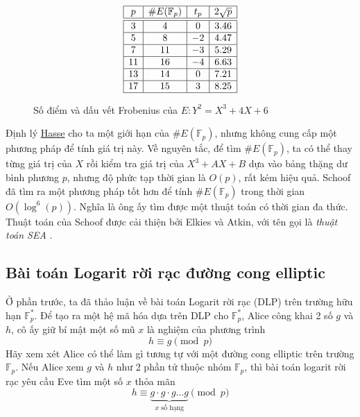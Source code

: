 \begin{figure}[H]
	\label{fg:tb2}
	\caption{Số điểm và dấu vết Frobenius của $E:Y^2 = X^3 + 4X + 6$}
	$$
		\begin{array}{|c|c|c|c|}
			\hline
			p  & \#E(\mathbb{F}_p) & t_p & 2\sqrt{p} \\
			\hline
			\hline
			3  & 4                 & 0   & 3.46      \\
			\hline
			5  & 8                 & -2  & 4.47      \\
			\hline
			7  & 11                & -3  & 5.29      \\
			\hline
			11 & 16                & -4  & 6.63      \\
			\hline
			13 & 14                & 0   & 7.21      \\
			\hline
			17 & 15                & 3   & 8.25      \\
			\hline
		\end{array}
	$$
\end{figure}

\begin{remark}
	Định lý \hyperref[th:th4]{Hasse} cho ta một giới hạn của $\#E(\mathbb{F}_p)$, nhưng không cung cấp một phương pháp để tính giá trị này.
	Về nguyên tắc, để tìm $\#E(\mathbb{F}_p)$, ta có thể thay từng giá trị của $X$ rồi kiểm tra giá trị của $X^3 + AX + B$ dựa vào bảng thặng dư bình phương $p$, nhưng độ phức tạp thời gian là $O(p)$, rất kém hiệu quả.
	Schoof \cite{schoof1985elliptic} đã tìm ra một phương pháp tốt hơn để tính $\#E(\mathbb{F}_p)$ trong thời gian $O(\log^6(p))$.
	Nghĩa là ông ấy tìm được một thuật toán có thời gian đa thức. Thuật toán của Schoof được cải thiện bởi Elkies và Atkin, với tên gọi là \textit{thuật toán SEA} \cite{schoof1995counting}.
\end{remark}


\subsection{Bài toán Logarit rời rạc đường cong elliptic}
Ở phần trước, ta đã thảo luận về bài toán Logarit rời rạc (DLP) trên trường hữu hạn $\mathbb{F}^*_p$.
Để tạo ra một hệ mã hóa dựa trên DLP cho $\mathbb{F}^*_p$, Alice công khai 2 số $g$ và $h$, cô ấy giữ bí mật một số mũ $x$ là nghiệm của phương trình
$$ h \equiv g \pmod{p} $$
Hãy xem xét Alice có thể làm gì tương tự với một đường cong elliptic trên trường $\mathbb{F}_p$.  Nếu Alice xem $g$ và $h$ như 2 phần tử thuộc nhóm $\mathbb{F}_p$,
thì bài toán logarit rời rạc yêu cầu Eve tìm một số $x$ thỏa mãn
$$ h \equiv \underbrace{ g \cdot g \cdot g \ldots g }_{\text{$x$ số hạng}} \pmod{p} $$

